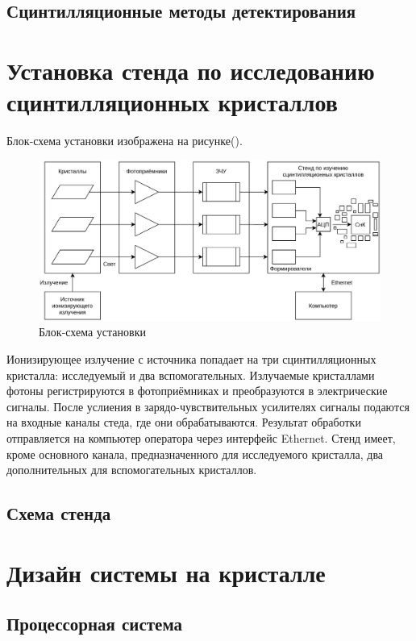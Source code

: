 \documentclass[a4paper, 12pt]{article}
\begin{document}
    \subsection{Сцинтилляционные методы детектирования}
    

\section{Установка стенда по исследованию сцинтилляционных кристаллов}
    Блок-схема установки изображена на рисунке().
    \begin{figure}[ht]
        \centering
        \includegraphics[width=1\linewidth]{Experimental_setup.png}
        \caption{Блок-схема установки}
        \label{fig:mpr}
    \end{figure}
    Ионизирующее излучение с источника попадает на три сцинтилляционных кристалла: исследуемый и два вспомогательных. Излучаемые кристаллами фотоны регистрируются в фотоприёмниках и преобразуются в электрические сигналы. После услиения в зарядо-чувствительных усилителях сигналы подаются на входные каналы стеда, где они обрабатываются. Результат обработки отправляется на компьютер оператора через интерфейс Ethernet. Стенд имеет, кроме основного канала, предназначенного для исследуемого кристалла, два дополнительных для вспомогательных кристаллов.
    
    \subsection{Схема стенда}
    

\section{Дизайн системы на кристалле}
    \subsection{Процессорная система}
    
\end{document}
